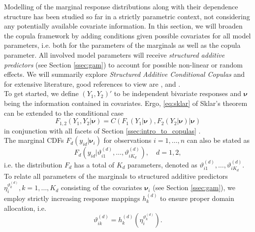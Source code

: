 
Modelling of the marginal response distributions along with their dependence structure has been studied so far in a strictly parametric context, not considering any potentially available covariate information. In this section, we will broaden the copula framework by adding conditions given possible covariates for all model parameters, i.e. both for the parameters of the marginals as well as the copula parameter. All involved model parameters will receive \textit{structured additive predictors} (see Section \ref{ssec:gam}) to account for possible non-linear or random effects. We will summarily explore \textit{Structured Additive Conditional Copulas} and for extensive literature, good references to view are \cite{klein2016simultaneous}, \cite{vatter2019gamcopula} and \cite{marra1605bivariate}. \\

To get started, we define $(Y_1, Y_2)'$ to be independent bivariate responses and $\bm{\nu}$ being the information contained in covariates. Ergo, \autoref{eq:sklar} of Sklar's theorem can be extended to the conditional case
\begin{equation}
F_{1,2}\left(Y_{1}, Y_{2} | \bm{\nu} \right)=C\left(F_{1}\left(Y_{1} | \bm{\nu} \right), F_{2}\left(Y_{2} | \bm{\nu} \right) | \bm{\nu} \right)
\label{eq:sklar_conditional}
\end{equation}
in conjunction with all facets of Section \ref{ssec:intro_to_copulas} \citep{patton2006modelling}.\\
The marginal \acp{CDF} $F_{d}\left(y_{i d} | \bm{\nu}_i\right)$ for observations $i = 1,\ldots, n$ can also be stated as
\begin{equation}
F_{d}\left(y_{i d} | \vartheta_{i 1}^{(d)}, \ldots, \vartheta_{i K_{d}}^{(d)}\right), \quad d = 1, 2,
\end{equation}
i.e. the distribution $F_d$ has a total of $K_d$ parameters, denoted as $\vartheta_{i 1}^{(d)}, \ldots, \vartheta_{i K_{d}}^{(d)}$.
To relate all parameters of the marginals to structured additive predictors $\eta_i^{\vartheta_k^{(d)}},  k = 1,\ldots, K_d$ consisting of the covariates $\bm{\nu}_i$ (see Section \ref{ssec:gam}), we employ strictly increasing response mappings $h_k^{(d)}$ to ensure proper domain allocation, i.e.
\begin{equation}
\vartheta_{i k}^{(d)}=h_{k}^{(d)}(\eta_{i}^{\vartheta_{k}^{(d)}}).
\label{eq:parameter_mapping}
\end{equation}
\\

